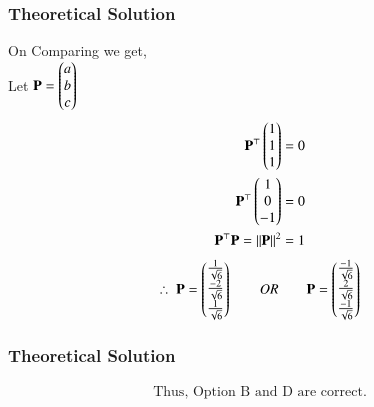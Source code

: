 \documentclass{beamer}
\begin{document}
\begin{frame}[fragile]
    \frametitle{Theoretical Solution}
On Comparing we get,\\
Let $\mathbf{P} = \begin{pmatrix}a \\ b \\c\end{pmatrix}$
\begin{align}
\mathbf{P}^\top\begin{pmatrix}1 \\ 1 \\ 1\end{pmatrix} &= 0\\
\mathbf{P}^\top\begin{pmatrix}1 \\ 0 \\ -1\end{pmatrix} &= 0\\
\mathbf{P}^\top\mathbf{P} = \left\lVert\mathbf{P}\right\rVert^2 &=  1
\end{align}
\begin{align}
    \therefore \; \mathbf{P} = \begin{pmatrix}\frac{1}{\sqrt{6}} \\ \frac{-2}{\sqrt{6}} \\ \frac{1}{\sqrt{6}}\end{pmatrix} 
     \qquad OR \qquad
    \mathbf{P} = \begin{pmatrix}\frac{-1}{\sqrt{6}} \\ \frac{2}{\sqrt{6}} \\ \frac{-1}{\sqrt{6}}\end{pmatrix}
    \end{align}
\end{frame}

\begin{frame}[fragile]
    \frametitle{Theoretical Solution}
\begin{align*}
    \boxed{\text{Thus, Option B and D are correct.}}
\end{align*}
\end{frame}
\end{document}
